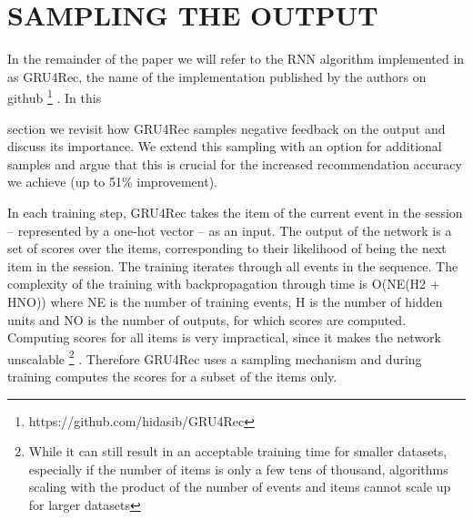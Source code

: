 \documentclass{article} %
\begin{document}



\section{SAMPLING THE OUTPUT}
\label{sec:sample}

In the remainder of the paper we will refer to the RNN algorithm implemented in \cite{hidasi2015session} as GRU4Rec, the name of the implementation published by the authors on github \footnote{https://github.com/hidasib/GRU4Rec}
. In this

section we revisit how GRU4Rec samples negative feedback on the output and discuss its importance. We extend this sampling with an option for additional samples and argue that this is crucial
for the increased recommendation accuracy we achieve (up to 51\% improvement).


In each training step, GRU4Rec takes the item of the current event in the session – represented
by a one-hot vector – as an input. The output of the network is a set of scores over the items,
corresponding to their likelihood of being the next item in the session. The training iterates through
all events in the sequence. The complexity of the training with backpropagation through time is
O(NE(H2 + HNO)) where NE is the number of training events, H is the number of hidden units
and NO is the number of outputs, for which scores are computed. Computing scores for all items
is very impractical, since it makes the network unscalable \footnote[2]{While it can still result in an acceptable training time for smaller datasets, especially if the number of items
is only a few tens of thousand, algorithms scaling with the product of the number of events and items cannot
scale up for larger datasets}
. Therefore GRU4Rec uses a sampling
mechanism and during training computes the scores for a subset of the items only.
\end{document}
